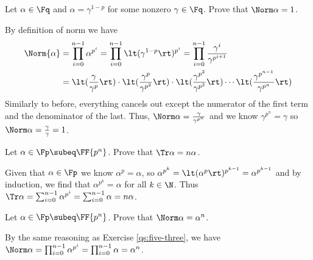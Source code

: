 \documentclass{article}
\begin{document}
\begin{subexercise} %
Let \( \alpha\in\Fq \) and \( \alpha=\gamma^{1-p} \) for some nonzero \( \gamma\in\Fq \).
Prove that \( \Norm \alpha = 1 \).
\end{subexercise}
\begin{solution}
By definition of norm we have \begin{align*}
  \Norm{\alpha} &= \prod_{i=0}^{n-1} \alpha^{p^i} = \prod_{i=0}^{n-1} \lt(\gamma^{1-p}\rt)^{p^i} = \prod_{i=0}^{n-1} \frac{\gamma^i}{\gamma^{p^{i+1}}} \\
  &= \lt(\frac{\gamma}{\gamma^p}\rt) \cdot \lt(\frac{\gamma^p}{\gamma^{p^2}}\rt) \cdot \lt(\frac{\gamma^{p^2}}{\gamma^{p^3}}\rt) \cdots \lt(\frac{\gamma^{p^{n-1}}}{\gamma^{p^n}}\rt)
\end{align*}
Similarly to before, everything cancels out except the numerator of the first term and the denominator of the last.
Thus, \( \Norm \alpha = \frac{\gamma}{\gamma^{p^n}} \) and we know \( \gamma^{p^n} = \gamma \) so \( \Norm \alpha = \frac{\gamma}{\gamma} = 1 \).
\end{solution}

\begin{subexercise} %
  \label{qs:five-three}
  Let \( \alpha\in\Fp \subeq \FF{p^n} \).
  Prove that \( \Tr \alpha = n\alpha \).
\end{subexercise}
\begin{solution}
Given that \( \alpha\in\Fp \) we know \( \alpha^p = \alpha \), so \( \alpha^{p^k} = \lt(\alpha^{p}\rt)^{p^{k-1}} = \alpha^{p^{k-1}} \) and by induction, we find that \( \alpha^{p^k} = \alpha \) for all \( k\in\N \).
Thus \( \Tr \alpha = \sum_{i=0}^{n-1} \alpha^{p^i} = \sum_{i=0}^{n-1} \alpha = n\alpha \).
\end{solution}

\begin{subexercise} %
  Let \( \alpha\in\Fp \subeq \FF{p^n} \).
  Prove that \( \Norm \alpha = \alpha^n \).
\end{subexercise}
\begin{solution}
  By the same reasoning as Exercise \ref{qs:five-three}, we have \( \Norm \alpha = \prod_{i=0}^{n-1} \alpha^{p^i} = \prod_{i=0}^{n-1} \alpha = \alpha^n \).
\end{solution}
\end{document}
